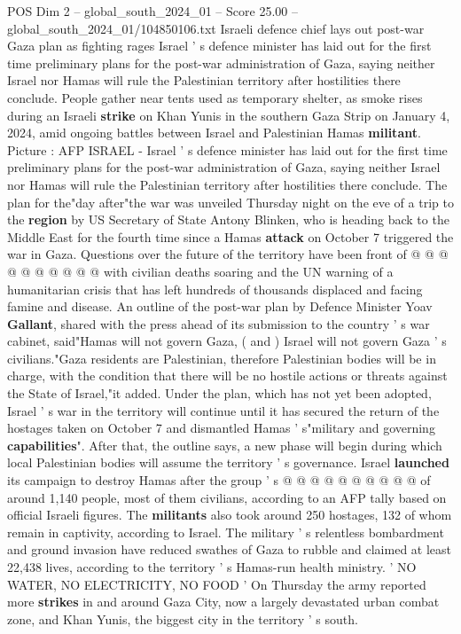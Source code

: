 \begin{textsample}{POS Dim 2 – global\_south\_2024\_01 – Score 25.00 – global\_south\_2024\_01/104850106.txt}  \label{ex:f2_pos_094}
Israeli defence chief lays out post-war Gaza plan as fighting rages Israel ' s defence minister has laid out for the first time preliminary plans for the post-war administration of Gaza, saying neither Israel nor Hamas will rule the Palestinian territory after hostilities there conclude.
People gather near tents used as temporary shelter, as smoke rises during an Israeli \textbf{strike} on Khan Yunis in the southern Gaza Strip on January 4, 2024, amid ongoing battles between Israel and Palestinian Hamas \textbf{militant}.
Picture : AFP ISRAEL - Israel ' s defence minister has laid out for the first time preliminary plans for the post-war administration of Gaza, saying neither Israel nor Hamas will rule the Palestinian territory after hostilities there conclude.
The plan for the"day after"the war was unveiled Thursday night on the eve of a trip to the \textbf{region} by US Secretary of State Antony Blinken, who is heading back to the Middle East for the fourth time since a Hamas \textbf{attack} on October 7 triggered the war in Gaza.
Questions over the future of the territory have been front of @ @ @ @ @ @ @ @ @ @ with civilian deaths soaring and the UN warning of a humanitarian crisis that has left hundreds of thousands displaced and facing famine and disease.
An outline of the post-war plan by Defence Minister Yoav \textbf{Gallant}, shared with the press ahead of its submission to the country ' s war cabinet, said"Hamas will not govern Gaza, ( and ) Israel will not govern Gaza ' s civilians."Gaza residents are Palestinian, therefore Palestinian bodies will be in charge, with the condition that there will be no hostile actions or threats against the State of Israel,"it added.
Under the plan, which has not yet been adopted, Israel ' s war in the territory will continue until it has secured the return of the hostages taken on October 7 and dismantled Hamas ' s"military and governing \textbf{capabilities}".
After that, the outline says, a new phase will begin during which local Palestinian bodies will assume the territory ' s governance.
Israel \textbf{launched} its campaign to destroy Hamas after the group ' s @ @ @ @ @ @ @ @ @ @ of around 1,140 people, most of them civilians, according to an AFP tally based on official Israeli figures.
The \textbf{militants} also took around 250 hostages, 132 of whom remain in captivity, according to Israel.
The military ' s relentless bombardment and ground invasion have reduced swathes of Gaza to rubble and claimed at least 22,438 lives, according to the territory ' s Hamas-run health ministry. ' NO WATER, NO ELECTRICITY, NO FOOD ' On Thursday the army reported more \textbf{strikes} in and around Gaza City, now a largely devastated urban combat zone, and Khan Yunis, the biggest city in the territory ' s south.

\end{textsample}
